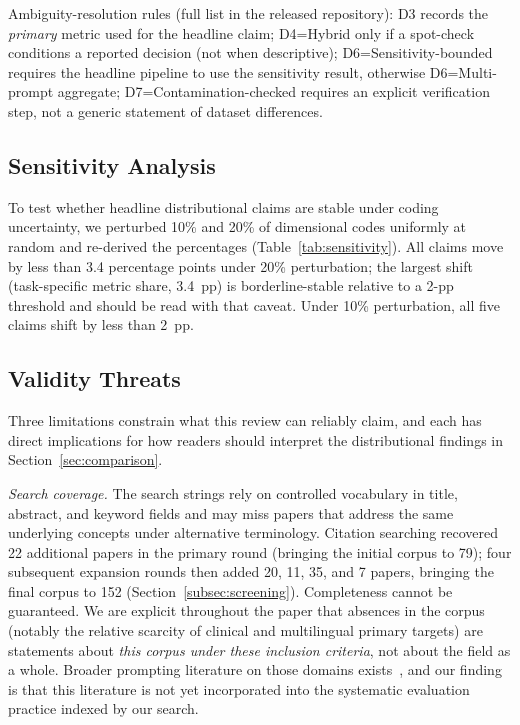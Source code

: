 \documentclass[acmsmall, nonacm, screen]{acmart}
\begin{document}
Ambiguity-resolution rules (full list in the released repository):
D3 records the \emph{primary} metric used for the headline claim;
D4=Hybrid only if a spot-check conditions a reported decision (not
when descriptive); D6=Sensitivity-bounded requires the headline
pipeline to use the sensitivity result, otherwise D6=Multi-prompt
aggregate; D7=Contamination-checked requires an explicit verification
step, not a generic statement of dataset differences.

\subsection{Sensitivity Analysis}
\label{subsec:sensitivity}

To test whether headline distributional claims are stable under
coding uncertainty, we perturbed 10\% and 20\% of dimensional codes
uniformly at random and re-derived the percentages
(Table~\ref{tab:sensitivity}). All claims move by less than 3.4
percentage points under 20\% perturbation; the largest shift (task-specific
metric share, 3.4~pp) is borderline-stable relative to a 2-pp
threshold and should be read with that caveat. Under 10\% perturbation,
all five claims shift by less than 2~pp.


\subsection{Validity Threats}

Three limitations constrain what this review can reliably claim, and
each has direct implications for how readers should interpret the
distributional findings in Section~\ref{sec:comparison}.

\textit{Search coverage.} The search strings rely on controlled
vocabulary in title, abstract, and keyword fields and may miss papers
that address the same underlying concepts under alternative
terminology. Citation searching recovered 22 additional papers in the
primary round (bringing the initial corpus to 79); four subsequent
expansion rounds then added 20, 11, 35, and 7 papers, bringing the
final corpus to 152 (Section~\ref{subsec:screening}).
Completeness cannot be guaranteed. We are explicit throughout the
paper that absences in the corpus (notably the relative scarcity of
clinical and multilingual primary targets) are statements about
\emph{this corpus under these inclusion criteria}, not about the
field as a whole. Broader prompting literature on those domains
exists~\cite{clinicalnlp2024, medicalcot2025, vatsal2024survey}, and
our finding is that this literature is not yet incorporated into the
systematic evaluation practice indexed by our search.
\end{document}
